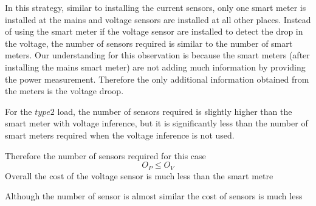 In this strategy, similar to installing the current sensors, only one smart meter is installed at the mains and voltage sensors are installed at all other places. Instead of using the smart meter if the voltage sensor  are installed to detect the drop in the voltage, the number of sensors required is similar to the number of smart meters. Our understanding for this observation is because the smart meters (after installing the mains smart meter) are not adding much information by providing the power measurement. Therefore the only additional information obtained from the meters is the voltage droop.

For the $type 2$ load, the number of sensors required is slightly higher than the smart meter with voltage inference, but it is significantly less than the number of smart meters required when the voltage inference is not used.

Therefore  the number of sensors required for this case
    $$O_P \le  O_V$$
 Overall the cost of the voltage sensor is much less than the smart metre

 Although the number of sensor is almost similar the cost of sensors is much less

